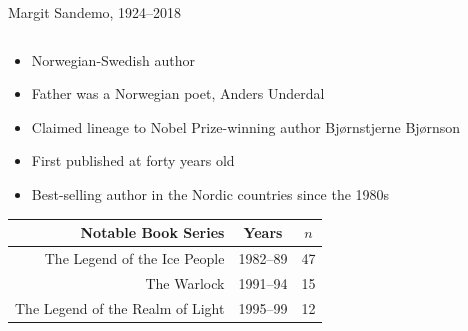 \begin{frame}{Margit Sandemo, 1924--2018}
    \begin{columns}[T]
        \begin{column}{0.6\textwidth}
            \begin{itemize}
                \item Norwegian-Swedish author
                \item Father was a Norwegian poet, Anders Underdal
                \item Claimed lineage to Nobel Prize-winning author Bjørnstjerne Bjørnson
                \item First published at forty years old
                \item Best-selling author in the Nordic countries since the 1980s
            \end{itemize}
            \vfill
            \begin{scriptsize}
                \begin{table}
                    \begin{tabular}{rcc}
                        \textbf{Notable Book Series}     & \textbf{Years} & $n$ \\ \midrule
                        The Legend of the Ice People     & 1982--89       & 47  \\
                        The Warlock                      & 1991--94       & 15  \\
                        The Legend of the Realm of Light & 1995--99       & 12
                    \end{tabular}
                \end{table}
            \end{scriptsize}
        \end{column}
        \begin{column}{0.4\textwidth}
            \centering

\end{column}
\end{columns}
\end{frame}
